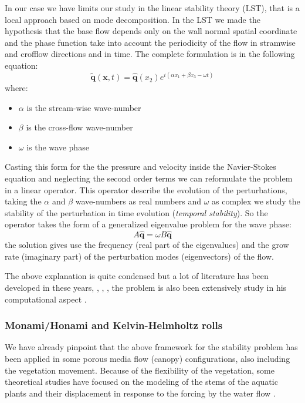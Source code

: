 In our case we have limits our study in the linear stability theory (LST), that is a local approach based on mode decomposition.
In the LST we made the hypothesis that the base flow depends only on the wall normal spatial coordinate and the phase function take into account the periodicity of the flow in stramwise and crofflow directions and in time.
The complete formulation is in the following equation:
 $$  \widetilde{\mathbf{q}}(\mathbf{x},t) =  \widehat{\mathbf{q}}(x_2) e^{i(\alpha x_1 + \beta x_3 - \omega t)}  $$ 
where:
\begin{itemize}
	\item $\alpha$ is the stream-wise wave-number
	\item $\beta$ is the cross-flow wave-number
	\item $\omega$ is the wave phase
\end{itemize}

Casting this form for the the pressure and velocity inside the Navier-Stokes equation and neglecting the second order terms we can reformulate the problem in a linear operator.
This operator describe the evolution of the perturbations, taking the $\alpha$ and $\beta$ wave-numbers as real numbers and $\omega$ as complex we study the stability of the perturbation in time evolution (\textit{temporal stability}).
So the operator takes the form of a generalized eigenvalue problem for the wave phase:
$$ A \widehat{\mathbf{q}}=  \omega B\widehat{\mathbf{q}} $$
the solution gives use the frequency (real part of the eigenvalues) and the grow rate (imaginary part) of the perturbation modes (eigenvectors) of the flow.

The above explanation is quite condensed but a lot of literature has been developed in these years, \citet{juniper2014modal}, \citet{criminale2003theory}, \citet{schmid2012stability}, the problem is also been extensively study in his computational aspect \citet{canuto1988spectral}.

\subsubsection{Monami/Honami and Kelvin-Helmholtz rolls}

We have already pinpoint that the above framework for the stability problem has been applied in some porous media flow (canopy) configurations, also including the vegetation movement.
Because of the flexibility of the vegetation, some theoretical studies have focused on the
modeling of the stems of the aquatic plants and their displacement in response to the forcing by the
water flow \citet{py2004mixing} \citet{patil2010characteristics} \citet{gosselin2009destabilising} \citet{py2006frequency}.

